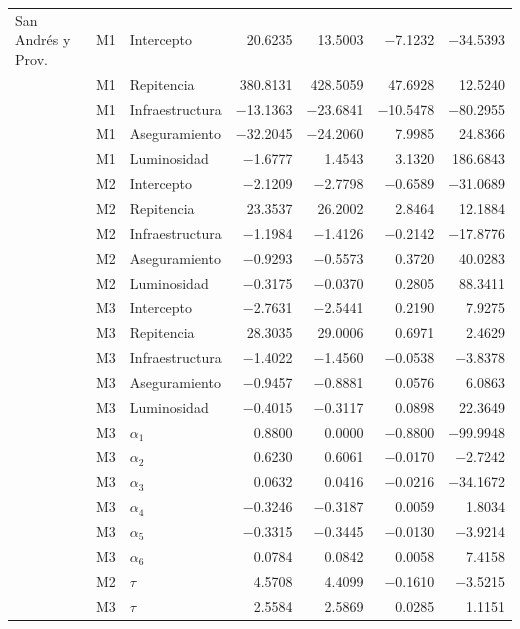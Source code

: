 \begin{longtable}{l c l r r r r}
San Andrés y Prov. & M1 & Intercepto & \num{20.6235} & \num{13.5003} & \num{-7.1232} & \num{-34.5393} \\
 & M1 & Repitencia & \num{380.8131} & \num{428.5059} & \num{47.6928} & \num{12.5240} \\
 & M1 & Infraestructura & \num{-13.1363} & \num{-23.6841} & \num{-10.5478} & \num{-80.2955} \\
 & M1 & Aseguramiento & \num{-32.2045} & \num{-24.2060} & \num{7.9985} & \num{24.8366} \\
 & M1 & Luminosidad & \num{-1.6777} & \num{1.4543} & \num{3.1320} & \num{186.6843} \\
 & M2 & Intercepto & \num{-2.1209} & \num{-2.7798} & \num{-0.6589} & \num{-31.0689} \\
 & M2 & Repitencia & \num{23.3537} & \num{26.2002} & \num{2.8464} & \num{12.1884} \\
 & M2 & Infraestructura & \num{-1.1984} & \num{-1.4126} & \num{-0.2142} & \num{-17.8776} \\
 & M2 & Aseguramiento & \num{-0.9293} & \num{-0.5573} & \num{0.3720} & \num{40.0283} \\
 & M2 & Luminosidad & \num{-0.3175} & \num{-0.0370} & \num{0.2805} & \num{88.3411} \\
 & M3 & Intercepto & \num{-2.7631} & \num{-2.5441} & \num{0.2190} & \num{7.9275} \\
 & M3 & Repitencia & \num{28.3035} & \num{29.0006} & \num{0.6971} & \num{2.4629} \\
 & M3 & Infraestructura & \num{-1.4022} & \num{-1.4560} & \num{-0.0538} & \num{-3.8378} \\
 & M3 & Aseguramiento & \num{-0.9457} & \num{-0.8881} & \num{0.0576} & \num{6.0863} \\
 & M3 & Luminosidad & \num{-0.4015} & \num{-0.3117} & \num{0.0898} & \num{22.3649} \\
 & M3 & $\alpha_{1}$ & \num{0.8800} & \num{0.0000} & \num{-0.8800} & \num{-99.9948} \\
 & M3 & $\alpha_{2}$ & \num{0.6230} & \num{0.6061} & \num{-0.0170} & \num{-2.7242} \\
 & M3 & $\alpha_{3}$ & \num{0.0632} & \num{0.0416} & \num{-0.0216} & \num{-34.1672} \\
 & M3 & $\alpha_{4}$ & \num{-0.3246} & \num{-0.3187} & \num{0.0059} & \num{1.8034} \\
 & M3 & $\alpha_{5}$ & \num{-0.3315} & \num{-0.3445} & \num{-0.0130} & \num{-3.9214} \\
 & M3 & $\alpha_{6}$ & \num{0.0784} & \num{0.0842} & \num{0.0058} & \num{7.4158} \\
 & M2 & $\tau$ & \num{4.5708} & \num{4.4099} & \num{-0.1610} & \num{-3.5215} \\
 & M3 & $\tau$ & \num{2.5584} & \num{2.5869} & \num{0.0285} & \num{1.1151} \\


\end{longtable}
